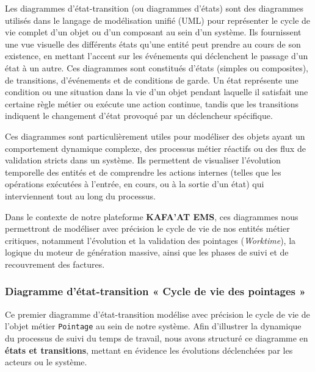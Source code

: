 \documentclass[12pt, a4paper, openany]{report}
\begin{document}
\vspace{-0.4cm}
Les diagrammes d'état-transition (ou diagrammes d'états) sont des diagrammes utilisés dans le langage de modélisation unifié (UML) pour représenter le cycle de vie complet d'un objet ou d'un composant au sein d'un système. Ils fournissent une vue visuelle des différents états qu'une entité peut prendre au cours de son existence, en mettant l'accent sur les événements qui déclenchent le passage d'un état à un autre. Ces diagrammes sont constitués d'états (simples ou composites), de transitions, d'événements et de conditions de garde. Un état représente une condition ou une situation dans la vie d'un objet pendant laquelle il satisfait une certaine règle métier ou exécute une action continue, tandis que les transitions indiquent le changement d'état provoqué par un déclencheur spécifique.

Ces diagrammes sont particulièrement utiles pour modéliser des objets ayant un comportement dynamique complexe, des processus métier réactifs ou des flux de validation stricts dans un système. Ils permettent de visualiser l'évolution temporelle des entités et de comprendre les actions internes (telles que les opérations exécutées à l'entrée, en cours, ou à la sortie d'un état) qui interviennent tout au long du processus. \cite{uml_ibm}

Dans le contexte de notre plateforme \textbf{KAFA'AT EMS}, ces diagrammes nous permettront de modéliser avec précision le cycle de vie de nos entités métier critiques, notamment l'évolution et la validation des pointages (\textit{Worktime}), la logique du moteur de génération massive, ainsi que les phases de suivi et de recouvrement des factures.

\vspace{-0.4cm}
\subsubsection{Diagramme d'état-transition « Cycle de vie des pointages »}

\vspace{-0.4cm}
Ce premier diagramme d'état-transition modélise avec précision le cycle de vie de l'objet métier \texttt{Pointage} au sein de notre système. Afin d'illustrer la dynamique du processus de suivi du temps de travail, nous avons structuré ce diagramme en \textbf{états et transitions}, mettant en évidence les évolutions déclenchées par les acteurs ou le système.
\end{document}
